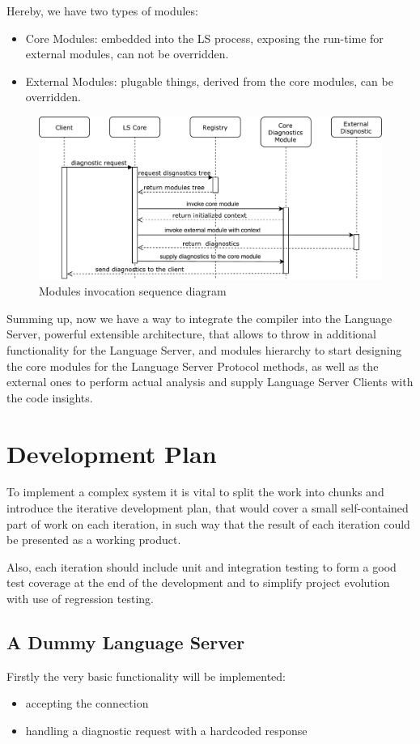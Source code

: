 Hereby, we have two types of modules:
\begin{itemize}
    \item Core Modules: embedded into the LS process, exposing the run-time for external modules, can not be overridden.
    \item External Modules: plugable things, derived from the core modules, can be overridden.
\end{itemize}

\begin{figure}[H]
    \centering
    \includegraphics[width=1.0\textwidth]{figs/modules_sd.pdf}
    \caption{Modules invocation sequence diagram}
\end{figure}

Summing up, now we have a way to integrate the compiler into the Language Server, powerful extensible architecture,
that allows to throw in additional functionality for the Language Server, 
and modules hierarchy to start designing the core modules for the Language Server Protocol methods, as well as
the external ones to perform actual analysis and supply Language Server Clients with the code insights.

\section{Development Plan}
To implement a complex system it is vital to split the work into chunks and introduce
the iterative development plan, that would cover a small self-contained part of work on each iteration,
in such way that the result of each iteration could be presented as a working product.

Also, each iteration should include unit and integration testing to form a good test coverage
at the end of the development and to simplify project evolution with use of regression testing.

\subsection{A Dummy Language Server}
Firstly the very basic functionality will be implemented: 
\begin{itemize}
    \item accepting the connection
    \item handling a diagnostic request with a hardcoded response
\end{itemize}

